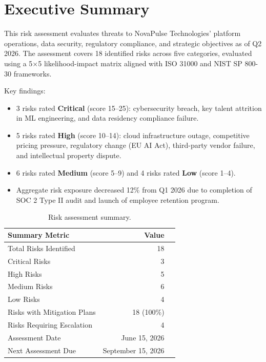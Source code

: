 \documentclass[
    language=english,
    doctype=risk-assessment,
    institution=none,
]{../../omnilatex}
\begin{document}
\maketitle

\section*{Executive Summary}

This risk assessment evaluates threats to NovaPulse Technologies' platform
operations, data security, regulatory compliance, and strategic objectives
as of Q2 2026. The assessment covers 18 identified risks across five
categories, evaluated using a 5$\times$5 likelihood-impact matrix aligned
with ISO 31000 and NIST SP 800-30 frameworks.

Key findings:

\begin{itemize}
    \item 3 risks rated \textbf{Critical} (score 15--25): cybersecurity
          breach, key talent attrition in ML engineering, and data residency
          compliance failure.
    \item 5 risks rated \textbf{High} (score 10--14): cloud infrastructure
          outage, competitive pricing pressure, regulatory change (EU AI Act),
          third-party vendor failure, and intellectual property dispute.
    \item 6 risks rated \textbf{Medium} (score 5--9) and 4 risks rated
          \textbf{Low} (score 1--4).
    \item Aggregate risk exposure decreased 12\% from Q1 2026 due to
          completion of SOC 2 Type II audit and launch of employee retention
          program.
\end{itemize}

\begin{table}[h]
    \centering
    \begin{tabular}{lrr}
        \toprule
        \textbf{Summary Metric} & \textbf{Value} \\
        \midrule
        Total Risks Identified       & 18 \\
        Critical Risks               & 3  \\
        High Risks                   & 5  \\
        Medium Risks                 & 6  \\
        Low Risks                    & 4  \\
        Risks with Mitigation Plans  & 18 (100\%) \\
        Risks Requiring Escalation   & 4  \\
        Assessment Date              & June 15, 2026 \\
        Next Assessment Due          & September 15, 2026 \\
        \bottomrule
    \end{tabular}
    \caption{Risk assessment summary.}
\end{table}
\end{document}
